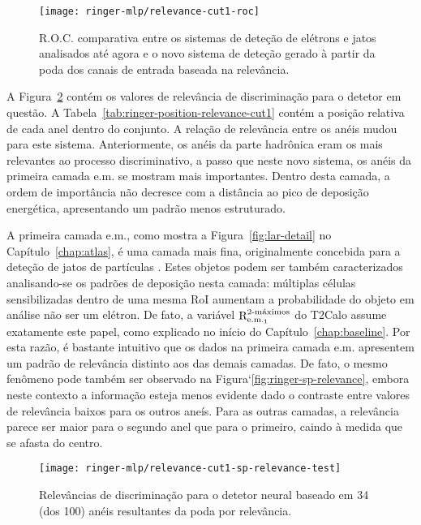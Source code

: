 \begin{figure}
\begin{center}
\texttt{[image: ringer-mlp/relevance-cut1-roc]}
\end{center}
\caption{R.O.C. comparativa entre os sistemas de deteção de elétrons e jatos
analisados até agora e o novo sistema de deteção gerado à partir da poda dos
canais de entrada baseada na relevância.}
\label{fig:relev-cut1-roc}
\end{figure}

A Figura~\ref{fig:relevance-cut1-sp-relevance} contém os valores de relevância
de discriminação para o detetor em questão. A
Tabela~\ref{tab:ringer-position-relevance-cut1} contém a posição relativa de
cada anel dentro do conjunto. A relação de relevância entre os anéis mudou
para este sistema. Anteriormente, os anéis da parte hadrônica eram os mais
relevantes ao processo discriminativo, a passo que neste novo sistema, os
anéis da primeira camada e.m. se mostram mais importantes. Dentro desta
camada, a ordem de importância não decresce com a distância ao pico de
deposição energética, apresentando um padrão menos estruturado.

A primeira camada e.m., como mostra a Figura~\ref{fig:lar-detail} no
Capítulo~\ref{chap:atlas}, é uma camada mais fina, originalmente concebida
para a deteção de jatos de partículas \cite{lar-tdr}. Estes objetos podem ser
também caracterizados analisando-se os padrões de deposição nesta camada:
múltiplas células sensibilizadas dentro de uma mesma RoI aumentam a
probabilidade do objeto em análise não ser um elétron. De fato, a variável
$\eratio$ do T2Calo assume exatamente este papel, como explicado no início do
Capítulo~\ref{chap:baseline}. Por esta razão, é bastante intuitivo que os
dados na primeira camada e.m. apresentem um padrão de relevância distinto aos
das demais camadas. De fato, o mesmo fenômeno pode também ser observado na
Figura`\ref{fig:ringer-sp-relevance}, embora neste contexto a informação
esteja menos evidente dado o contraste entre valores de relevância baixos para
os outros aneís. Para as outras camadas, a relevância parece ser maior para o
segundo anel que para o primeiro, caindo à medida que se afasta do centro.

\begin{figure}
\begin{center}
\texttt{[image: ringer-mlp/relevance-cut1-sp-relevance-test]}
\end{center}
\caption{Relevâncias de discriminação para o detetor neural baseado em 34 (dos
100) anéis resultantes da poda por relevância.}
\label{fig:relevance-cut1-sp-relevance}
\end{figure}

